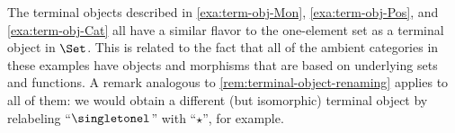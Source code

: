 \begin{remark}
    The terminal objects described in \cref{exa:term-obj-Mon}, \cref{exa:term-obj-Pos}, and \cref{exa:term-obj-Cat} all have a similar flavor to the one-element set as a terminal object in $\Set$.
    This is related to the fact that all of the ambient categories in these examples have objects and morphisms that are based on underlying sets and functions.
    A remark analogous to \cref{rem:terminal-object-renaming} applies to all of them: we would obtain a different (but isomorphic) terminal object by relabeling ``$\singletonel$'' with ``$\star$'', for example.
\end{remark}



